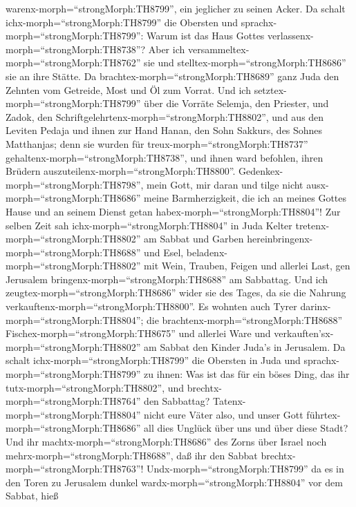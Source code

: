warenx-morph=``strongMorph:TH8799'', ein jeglicher zu seinen Acker.
 Da schalt ichx-morph=``strongMorph:TH8799'' die Obersten
und sprachx-morph=``strongMorph:TH8799'': Warum ist das Haus Gottes
verlassenx-morph=``strongMorph:TH8738''? Aber ich
versammeltex-morph=``strongMorph:TH8762'' sie und
stelltex-morph=``strongMorph:TH8686'' sie an ihre Stätte. 
Da brachtex-morph=``strongMorph:TH8689'' ganz Juda den Zehnten vom
Getreide, Most und Öl zum Vorrat.  Und ich
setztex-morph=``strongMorph:TH8799'' über die Vorräte Selemja, den
Priester, und Zadok, den Schriftgelehrtenx-morph=``strongMorph:TH8802'',
und aus den Leviten Pedaja und ihnen zur Hand Hanan, den Sohn Sakkurs,
des Sohnes Matthanjas; denn sie wurden für
treux-morph=``strongMorph:TH8737''
gehaltenx-morph=``strongMorph:TH8738'', und ihnen ward befohlen, ihren
Brüdern auszuteilenx-morph=``strongMorph:TH8800''. 
Gedenkex-morph=``strongMorph:TH8798'', mein Gott, mir daran und tilge
nicht ausx-morph=``strongMorph:TH8686'' meine Barmherzigkeit, die ich an
meines Gottes Hause und an seinem Dienst getan
habex-morph=``strongMorph:TH8804''!  Zur selben Zeit sah
ichx-morph=``strongMorph:TH8804'' in Juda Kelter
tretenx-morph=``strongMorph:TH8802'' am Sabbat und Garben
hereinbringenx-morph=``strongMorph:TH8688'' und Esel,
beladenx-morph=``strongMorph:TH8802'' mit Wein, Trauben, Feigen und
allerlei Last, gen Jerusalem bringenx-morph=``strongMorph:TH8688'' am
Sabbattag. Und ich zeugtex-morph=``strongMorph:TH8686'' wider sie des
Tages, da sie die Nahrung verkauftenx-morph=``strongMorph:TH8800''.
 Es wohnten auch Tyrer darinx-morph=``strongMorph:TH8804'';
die brachtenx-morph=``strongMorph:TH8688''
Fischex-morph=``strongMorph:TH8675'' und allerlei Ware und
verkauften'sx-morph=``strongMorph:TH8802'' am Sabbat den Kinder Juda's
in Jerusalem.  Da schalt ichx-morph=``strongMorph:TH8799''
die Obersten in Juda und sprachx-morph=``strongMorph:TH8799'' zu ihnen:
Was ist das für ein böses Ding, das ihr
tutx-morph=``strongMorph:TH8802'', und
brechtx-morph=``strongMorph:TH8764'' den Sabbattag? 
Tatenx-morph=``strongMorph:TH8804'' nicht eure Väter also, und unser
Gott führtex-morph=``strongMorph:TH8686'' all dies Unglück über uns und
über diese Stadt? Und ihr machtx-morph=``strongMorph:TH8686'' des Zorns
über Israel noch mehrx-morph=``strongMorph:TH8688'', daß ihr den Sabbat
brechtx-morph=``strongMorph:TH8763''! 
Undx-morph=``strongMorph:TH8799'' da es in den Toren zu Jerusalem dunkel
wardx-morph=``strongMorph:TH8804'' vor dem Sabbat, hieß
